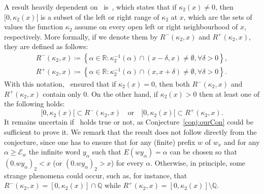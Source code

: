 \documentclass[12pt]{article}
\theoremstyle{plain}\newtheorem{teo}{Theorem}
\theoremstyle{plain}\newtheorem{proposition}[teo]{Proposition}
\theoremstyle{plain}\newtheorem{lemma}[teo]{Lemma}
\theoremstyle{plain}\newtheorem{corollary}[teo]{Corollary}
\theoremstyle{plain}\newtheorem{conjecture}[teo]{Conjecture}
\theoremstyle{definition}\newtheorem{definition}[teo]{Definition}
\theoremstyle{remark}\newtheorem{remark}[teo]{Remark}
\theoremstyle{definition}\newtheorem{example}[teo]{Example}
\numberwithin{teo}{section}
\numberwithin{equation}{section}
\begin{document}
A result heavily dependent on~\cite[Theorem 7]{Critical}
is~\cite[Proposition 19]{Critical},
which states that if $\kappa_2(x) \ne 0$,
then $[0,\kappa_2(x)[$ is a subset of the 
left or right range of $\kappa_2$ at $x$,
which are the sets of values 
the function $\kappa_2$ assume on every open
left or right neighbourhood of $x$, respectively.
More formally, 
if we denote them by $R^-(\kappa_2,x)$ and $R^+(\kappa_2,x)$,
they are defined as follows:
\begin{align*}
	R^-(\kappa_2,x)\coloneqq \left\{
		\alpha \in \mathbb{R}:\kappa_2^{-1}(\alpha)\cap(x-\delta,x)\ne\emptyset,
		\forall\delta>0
	\right\},\\
	R^+(\kappa_2,x)\coloneqq \left\{
		\alpha \in \mathbb{R}:\kappa_2^{-1}(\alpha)\cap(x,x+\delta)\ne\emptyset,
		\forall\delta>0
	\right\}.
\end{align*}
With this notation,~\cite[Proposition 19]{Critical}
ensured that if $\kappa_2(x) = 0$,
then both $R^-(\kappa_2,x)$ and $R^+(\kappa_2,x)$
contain only $0$.
On the other hand,
if $\kappa_2(x) > 0$
then at least one of the following holds:
\[
	[0,\kappa_2(x)[ \subset R^-(\kappa_2,x)
	\quad\text{or}\quad
	[0,\kappa_2(x)[ \subset R^+(\kappa_2,x).
\]
It remains uncertain if~\cite[Proposition 19]{Critical} holds true or not,
as Conjecture~\ref{conj:ourCon} could be sufficient to prove it.
We remark that the result does not follow directly from the conjecture,
since one has to ensure that for any (finite) prefix $w$ of $w_{x}$
and for any $\alpha \ge \mathcal{E}_{w}$ 
the infinite word $y_{\alpha}$ such that $E(wy_\alpha) = \alpha$
can be chosen so that 
$(0.wy_{\alpha})_2 < x$
(or $(0.wy_{\alpha})_2 > x$) for every $\alpha$.
Otherwise, in principle, some strange phenomena could occur,
such as, for instance, that
$R^-(\kappa_2,x) = [0,\kappa_2(x)] \cap \mathbb{Q}$
while
$R^+(\kappa_2,x) = [0,\kappa_2(x)] \setminus \mathbb{Q}$.
\end{document}
